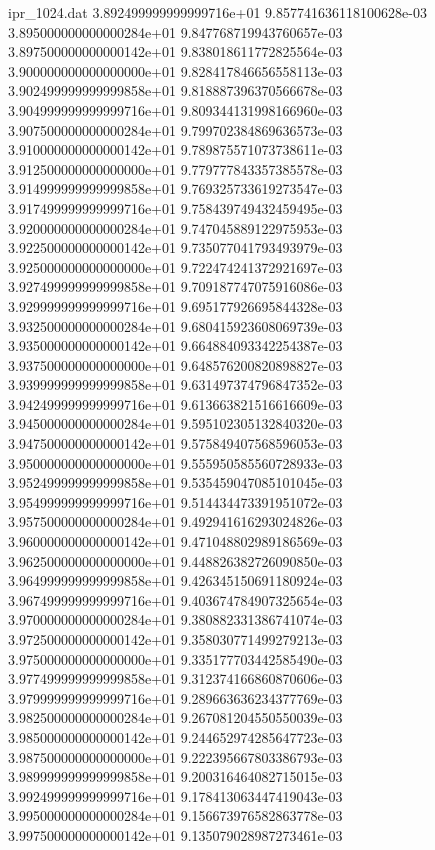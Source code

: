 \begin{filecontents}{ipr_1024.dat}
3.892499999999999716e+01 9.857741636118100628e-03
3.895000000000000284e+01 9.847768719943760657e-03
3.897500000000000142e+01 9.838018611772825564e-03
3.900000000000000000e+01 9.828417846656558113e-03
3.902499999999999858e+01 9.818887396370566678e-03
3.904999999999999716e+01 9.809344131998166960e-03
3.907500000000000284e+01 9.799702384869636573e-03
3.910000000000000142e+01 9.789875571073738611e-03
3.912500000000000000e+01 9.779777843357385578e-03
3.914999999999999858e+01 9.769325733619273547e-03
3.917499999999999716e+01 9.758439749432459495e-03
3.920000000000000284e+01 9.747045889122975953e-03
3.922500000000000142e+01 9.735077041793493979e-03
3.925000000000000000e+01 9.722474241372921697e-03
3.927499999999999858e+01 9.709187747075916086e-03
3.929999999999999716e+01 9.695177926695844328e-03
3.932500000000000284e+01 9.680415923608069739e-03
3.935000000000000142e+01 9.664884093342254387e-03
3.937500000000000000e+01 9.648576200820898827e-03
3.939999999999999858e+01 9.631497374796847352e-03
3.942499999999999716e+01 9.613663821516616609e-03
3.945000000000000284e+01 9.595102305132840320e-03
3.947500000000000142e+01 9.575849407568596053e-03
3.950000000000000000e+01 9.555950585560728933e-03
3.952499999999999858e+01 9.535459047085101045e-03
3.954999999999999716e+01 9.514434473391951072e-03
3.957500000000000284e+01 9.492941616293024826e-03
3.960000000000000142e+01 9.471048802989186569e-03
3.962500000000000000e+01 9.448826382726090850e-03
3.964999999999999858e+01 9.426345150691180924e-03
3.967499999999999716e+01 9.403674784907325654e-03
3.970000000000000284e+01 9.380882331386741074e-03
3.972500000000000142e+01 9.358030771499279213e-03
3.975000000000000000e+01 9.335177703442585490e-03
3.977499999999999858e+01 9.312374166860870606e-03
3.979999999999999716e+01 9.289663636234377769e-03
3.982500000000000284e+01 9.267081204550550039e-03
3.985000000000000142e+01 9.244652974285647723e-03
3.987500000000000000e+01 9.222395667803386793e-03
3.989999999999999858e+01 9.200316464082715015e-03
3.992499999999999716e+01 9.178413063447419043e-03
3.995000000000000284e+01 9.156673976582863778e-03
3.997500000000000142e+01 9.135079028987273461e-03
\end{filecontents}


